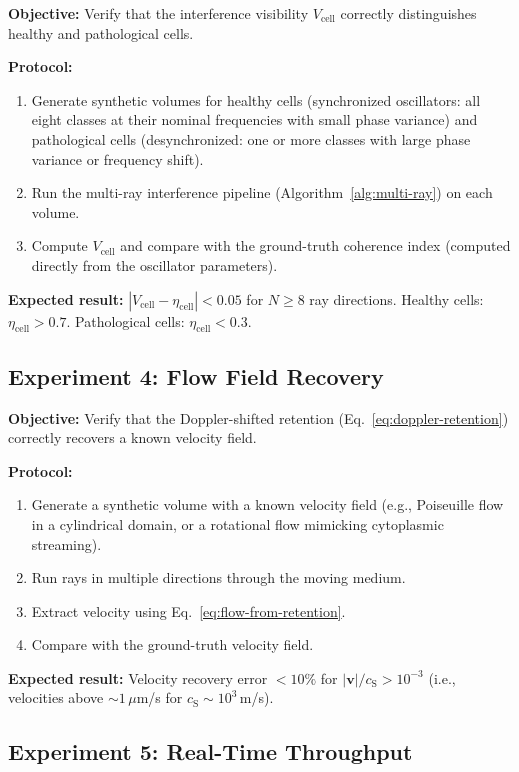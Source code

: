 \documentclass[11pt,twocolumn,a4paper]{article}
\newcommand{\etacell}{\eta_{\mathrm{cell}}}
\newcommand{\Vcell}{V_{\mathrm{cell}}}
\newcommand{\cS}{c_{\mathrm{S}}}
\begin{document}
\textbf{Objective:} Verify that the interference visibility $\Vcell$
correctly distinguishes healthy and pathological cells.

\textbf{Protocol:}
\begin{enumerate}[label=(\roman*),leftmargin=*]
\item Generate synthetic volumes for healthy cells (synchronized
  oscillators: all eight classes at their nominal frequencies with
  small phase variance) and pathological cells (desynchronized:
  one or more classes with large phase variance or frequency shift).
\item Run the multi-ray interference pipeline
  (Algorithm~\ref{alg:multi-ray}) on each volume.
\item Compute $\Vcell$ and compare with the ground-truth coherence
  index (computed directly from the oscillator parameters).
\end{enumerate}

\textbf{Expected result:} $|\Vcell - \etacell| < 0.05$ for $N \geq 8$
ray directions. Healthy cells: $\etacell > 0.7$. Pathological cells:
$\etacell < 0.3$.

\subsection{Experiment 4: Flow Field Recovery}

\textbf{Objective:} Verify that the Doppler-shifted retention
(Eq.~\eqref{eq:doppler-retention}) correctly recovers a known
velocity field.

\textbf{Protocol:}
\begin{enumerate}[label=(\roman*),leftmargin=*]
\item Generate a synthetic volume with a known velocity field (e.g.,
  Poiseuille flow in a cylindrical domain, or a rotational flow
  mimicking cytoplasmic streaming).
\item Run rays in multiple directions through the moving medium.
\item Extract velocity using Eq.~\eqref{eq:flow-from-retention}.
\item Compare with the ground-truth velocity field.
\end{enumerate}

\textbf{Expected result:} Velocity recovery error $< 10\%$ for
$|\mathbf{v}|/\cS > 10^{-3}$ (i.e., velocities above
$\sim\!1$\,$\mu$m/s for $\cS \sim 10^3$\,m/s).

\subsection{Experiment 5: Real-Time Throughput}
\end{document}
